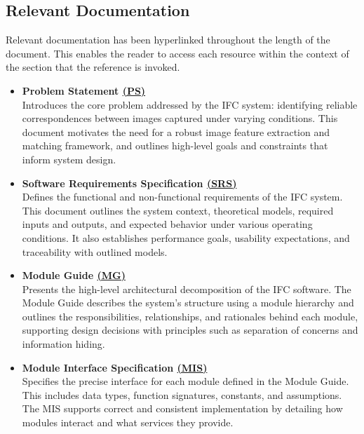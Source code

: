 \documentclass[12pt, titlepage]{article}
\begin{document}
\subsection{Relevant Documentation}
Relevant documentation has been hyperlinked throughout the length of the document. This enables 
the reader to access each resource within the context of the section that the reference is invoked.
\begin{itemize}

  \item \textbf{Problem Statement \href{https://github.com/KiranSingh15/CAS-741-Image-Correspondences/blob/main/docs/ProblemStatementAndGoals/ProblemStatement.tex}{(PS)}}\\
  Introduces the core problem addressed by the IFC system: identifying reliable correspondences between images captured under varying conditions. This document motivates the need for a robust image feature extraction and matching framework, and outlines high-level goals and constraints that inform system design.


  \item \textbf{Software Requirements Specification \href{https://github.com/KiranSingh15/CAS-741-Image-Correspondences/blob/main/docs/SRS/SRS.pdf}{(SRS)}}\\
  Defines the functional and non-functional requirements of the IFC system. This document outlines the system context, theoretical models, required inputs and outputs, and expected behavior under various operating conditions. It also establishes performance goals, usability expectations, and traceability with outlined models.
  
  \item \textbf{Module Guide \href{https://github.com/KiranSingh15/CAS-741-Image-Correspondences/blob/main/docs/Design/SoftArchitecture/MG.pdf}{(MG)}}\\
  Presents the high-level architectural decomposition of the IFC software. The Module Guide describes the system's structure using a module hierarchy and outlines the responsibilities, relationships, and rationales behind each module, supporting design decisions with principles such as separation of concerns and information hiding.
  
  \item \textbf{Module Interface Specification \href{https://github.com/KiranSingh15/CAS-741-Image-Correspondences/blob/main/docs/Design/SoftDetailedDes/MIS.pdf}{(MIS)}}\\
  Specifies the precise interface for each module defined in the Module Guide. This includes data types, function signatures, constants, and assumptions. The MIS supports correct and consistent implementation by detailing how modules interact and what services they provide.
  
  \end{itemize}
\end{document}
